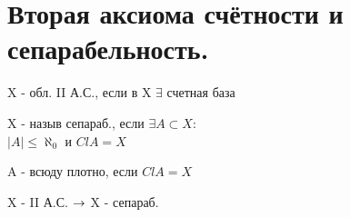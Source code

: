 \documentclass[geometry.tex]{subfiles}
\begin{document}
  \section{Вторая аксиома счётности и сепарабельность.}

  \begin{definition}
      X - обл. II А.С., если в X $\exists$ счетная база
  \end{definition}

  \begin{definition}
      X - назыв сепараб., если $\exists A \subset X$:\\
      $|A| \leq \aleph_0$ и $Cl A = X$
  \end{definition}

  \begin{definition}
      A - всюду плотно, если $Cl A = X$
  \end{definition}

  \begin{theorem}
      X - II А.С. $\rightarrow$ X - сепараб.
  \end{theorem}
\end{document}
